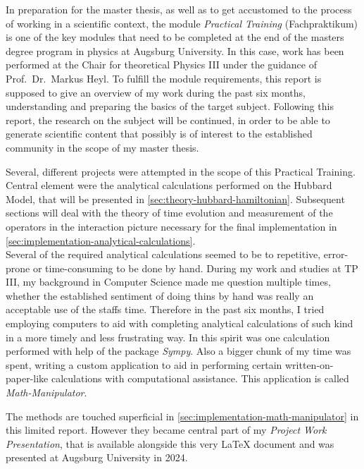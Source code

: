 In preparation for the master thesis, as well as to get accustomed to the process of working in a scientific context, the module \emph{Practical Training} (\glqq Fachpraktikum\grqq{}) is one of the key modules that need to be completed at the end of the masters degree program in physics at Augsburg University.
In this case, work has been performed at the Chair for theoretical Physics III under the guidance of  Prof.~Dr.~Markus Heyl.
To fulfill the module requirements, this report is supposed to give an overview of my work during the past six months, understanding and preparing the basics of the target subject.
Following this report, the research on the subject will be continued, in order to be able to generate scientific content that possibly is of interest to the established community in the scope of my master thesis.

Several, different projects were attempted in the scope of this Practical Training. 
Central element were the analytical calculations performed on the Hubbard Model, that will be presented in \autoref{sec:theory-hubbard-hamiltonian}.
Subsequent sections will deal with the theory of time evolution and measurement of the operators in the interaction picture necessary for the final implementation in \autoref{sec:implementation-analytical-calculations}.\\

Several of the required analytical calculations seemed to be to repetitive, error-prone or time-consuming to be done by hand. 
During my work and studies at TP III, my background in Computer Science made me question multiple times, whether the established sentiment of doing thins \glqq by hand\grqq{} was really an acceptable use of the staffs time.
Therefore in the past six months, I tried employing computers to aid with completing analytical calculations of such kind in a more timely and less frustrating way.
In this spirit was one calculation performed with help of the package \emph{Sympy}.
Also a bigger chunk of my time was spent, writing a custom application to aid in performing certain \glqq written-on-paper-like\grqq{} calculations with computational assistance. This application is called \emph{Math-Manipulator}.

The methods are touched superficial in \autoref{sec:implementation-math-manipulator} in this limited report. 
However they became central part of my \emph{Project Work Presentation}, that is available alongside this very LaTeX document \cite{selfDocument} and was presented at Augsburg University in 2024.